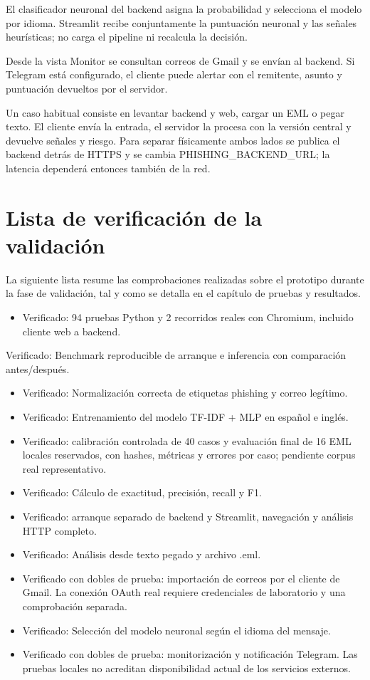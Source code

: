 \documentclass[11pt,a4paper,oneside]{report}
\begin{document}
El clasificador neuronal del backend asigna la probabilidad y selecciona el modelo por idioma. Streamlit recibe conjuntamente la puntuación neuronal y las señales heurísticas; no carga el pipeline ni recalcula la decisión.

Desde la vista Monitor se consultan correos de Gmail y se envían al backend. Si Telegram está configurado, el cliente puede alertar con el remitente, asunto y puntuación devueltos por el servidor.

Un caso habitual consiste en levantar backend y web, cargar un EML o pegar texto. El cliente envía la entrada, el servidor la procesa con la versión central y devuelve señales y riesgo. Para separar físicamente ambos lados se publica el backend detrás de HTTPS y se cambia PHISHING\_BACKEND\_URL; la latencia dependerá entonces también de la red.

\chapter{Lista de verificación de la validación}

La siguiente lista resume las comprobaciones realizadas sobre el prototipo durante la fase de validación, tal y como se detalla en el capítulo de pruebas y resultados.

\begin{itemize}
  \item Verificado: 94 pruebas Python y 2 recorridos reales con Chromium, incluido cliente web a backend.
\end{itemize}

Verificado: Benchmark reproducible de arranque e inferencia con comparación antes/después.

\begin{itemize}
  \item Verificado: Normalización correcta de etiquetas phishing y correo legítimo.
  \item Verificado: Entrenamiento del modelo TF-IDF + MLP en español e inglés.
  \item Verificado: calibración controlada de 40 casos y evaluación final de 16 EML locales reservados, con hashes, métricas y errores por caso; pendiente corpus real representativo.
  \item Verificado: Cálculo de exactitud, precisión, recall y F1.
  \item Verificado: arranque separado de backend y Streamlit, navegación y análisis HTTP completo.
  \item Verificado: Análisis desde texto pegado y archivo .eml.
  \item Verificado con dobles de prueba: importación de correos por el cliente de Gmail. La conexión OAuth real requiere credenciales de laboratorio y una comprobación separada.
  \item Verificado: Selección del modelo neuronal según el idioma del mensaje.
  \item Verificado con dobles de prueba: monitorización y notificación Telegram. Las pruebas locales no acreditan disponibilidad actual de los servicios externos.
\end{itemize}
\end{document}

